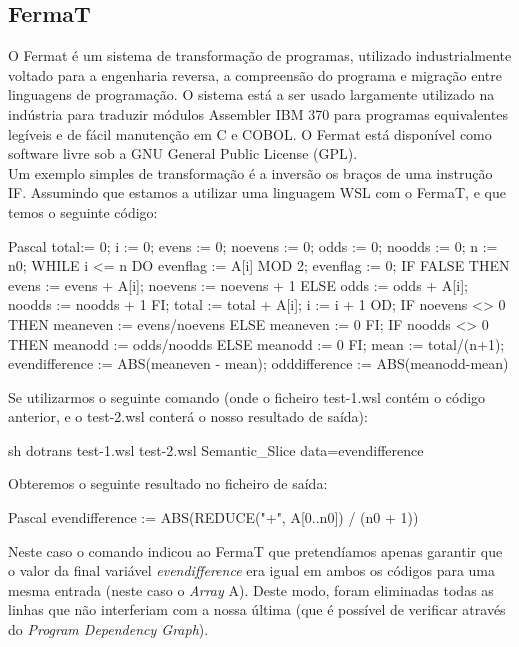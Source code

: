 \documentclass[runningheads,a4paper]{llncs}
\begin{document}
\begin{multicols}{2}
\subsection{FermaT}
O Fermat é um sistema de transformação de programas, utilizado industrialmente voltado para a engenharia reversa, a compreensão do programa e migração entre linguagens de programação. O sistema está a ser usado largamente utilizado na indústria para traduzir módulos Assembler IBM 370 para programas equivalentes legíveis e de fácil manutenção em C e COBOL. O Fermat está disponível como software livre sob a GNU General Public License (GPL).\\
Um exemplo simples de transformação é a inversão os braços de uma instrução IF.
Assumindo que estamos a utilizar uma linguagem WSL com o FermaT, e que temos o seguinte código:\\
\begin{myCode}{Pascal}
total:= 0;
i := 0;
evens := 0;
noevens := 0;
odds := 0;
noodds := 0;
n := n0;
WHILE i <= n DO
  evenflag := A[i] MOD 2;
  evenflag := 0;
  IF FALSE
    THEN evens := evens + A[i];
         noevens := noevens + 1
    ELSE odds := odds + A[i];
         noodds := noodds + 1 FI;
  total := total + A[i];
  i := i + 1 OD;
IF noevens <> 0
  THEN meaneven := evens/noevens
  ELSE meaneven := 0 FI;
IF noodds <> 0
  THEN meanodd := odds/noodds
  ELSE meanodd := 0 FI;
mean := total/(n+1);
evendifference := ABS(meaneven - mean);
odddifference := ABS(meanodd-mean)
\end{myCode}
Se utilizarmos o seguinte comando (onde o ficheiro test-1.wsl contém o código anterior, e o test-2.wsl conterá o nosso resultado de saída):\\
\begin{myCode}{sh}
dotrans test-1.wsl test-2.wsl Semantic\_Slice data=evendifference
\end{myCode}
Obteremos o seguinte resultado no ficheiro de saída:\\
\begin{myCode}{Pascal}
evendifference := ABS(REDUCE("+", A[0..n0]) / (n0 + 1))
\end{myCode}
Neste caso o comando indicou ao FermaT que pretendíamos apenas garantir que o valor da final variável \emph{evendifference} era igual em ambos os códigos para uma mesma entrada (neste caso o \emph{Array} A). Deste modo, foram eliminadas todas as linhas que não interferiam com a nossa última (que é possível de verificar através do \emph{Program Dependency Graph}).\\


\end{multicols}
\end{document}
